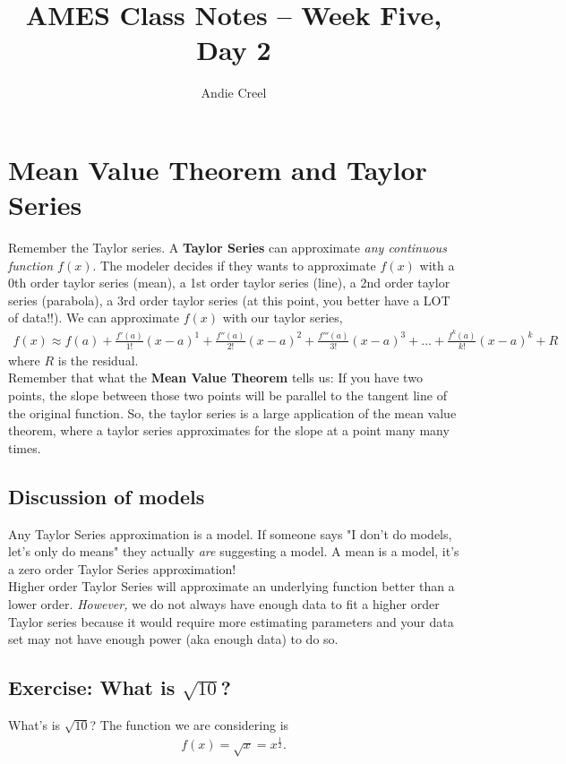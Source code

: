 \documentclass{article}
\title{AMES Class Notes -- Week Five, Day 2}
\author{Andie Creel}
\begin{document}
\maketitle

\section{Mean Value Theorem and Taylor Series}
Remember the Taylor series. A \textbf{Taylor Series} can approximate \textit{any continuous function $f(x)$}. The modeler decides if they wants to approximate $f(x)$ with a 0th order taylor series (mean), a 1st order taylor series (line), a 2nd order taylor series (parabola), a 3rd order taylor series (at this point, you better have a LOT of data!!). We can approximate $f(x)$ with our taylor series,
\begin{align}
    f(x) \approx f(a) + \frac{f'(a)}{1!}(x-a)^1 + \frac{f''(a)}{2!}(x-a)^2 + \frac{f'''(a)}{3!}(x-a)^3 + ... + \frac{f^k(a)}{k!}(x-a)^k + R
\end{align}
where $R$ is the residual.\\

Remember that what the \textbf{Mean Value Theorem} tells us: If you have two points, the slope between those two points will be parallel to the tangent line of the original function. So, the taylor series is a large application of the mean value theorem, where a taylor series approximates for the slope at a point many many times. 

\subsection{Discussion of models}
Any Taylor Series approximation is a model. If someone says "I don't do models, let's only do means" they actually \textit{are} suggesting a model. A mean is a model, it's a zero order Taylor Series approximation! \\

Higher order Taylor Series will approximate an underlying function better than a lower order. \textit{However,} we do not always have enough data to fit a higher order Taylor series because it would require more estimating parameters and your data set may not have enough power (aka enough data) to do so. 


\subsection{Exercise: What is $\sqrt{10}$?}
What's is $\sqrt{10}$? The function we are considering is
\begin{align}
    f(x) = \sqrt{x} = x^{\frac{1}{2}}.
\end{align}
\end{document}
